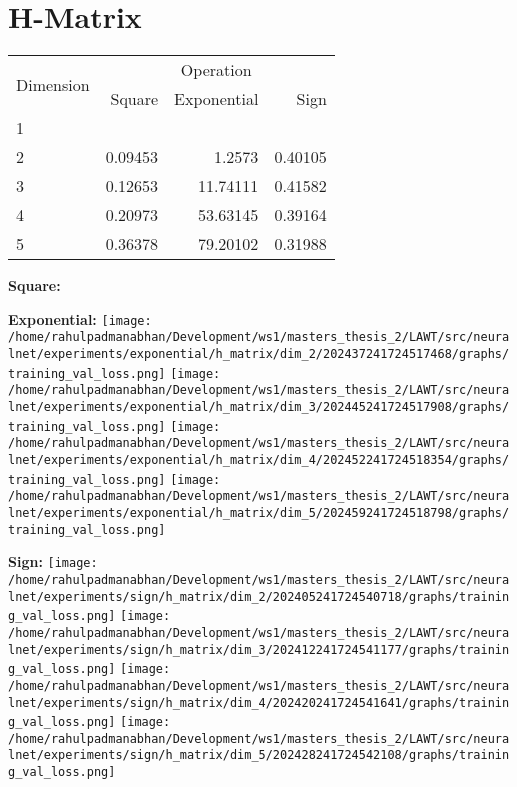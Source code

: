 \documentclass{article}
\begin{document}
\pagebreak
\section{H-Matrix}
\begin{tabular}{@{}lrrr@{}}
\toprule
\multirow{2}{*}{Dimension} & \multicolumn{3}{c}{Operation} \\
\cmidrule(l){2-4}
& Square & Exponential & Sign \\
\midrule
1 & & & \\
2 & 0.09453 & 1.2573 & 0.40105 \\
3 & 0.12653 & 11.74111 & 0.41582 \\
4 & 0.20973 & 53.63145 & 0.39164 \\
5 & 0.36378 & 79.20102 & 0.31988 \\
\bottomrule
\end{tabular}

\textbf{Square:}

\textbf{Exponential:}
\texttt{[image: /home/rahulpadmanabhan/Development/ws1/masters\_thesis\_2/LAWT/src/neuralnet/experiments/exponential/h\_matrix/dim\_2/202437241724517468/graphs/training\_val\_loss.png]}
\texttt{[image: /home/rahulpadmanabhan/Development/ws1/masters\_thesis\_2/LAWT/src/neuralnet/experiments/exponential/h\_matrix/dim\_3/202445241724517908/graphs/training\_val\_loss.png]}
\texttt{[image: /home/rahulpadmanabhan/Development/ws1/masters\_thesis\_2/LAWT/src/neuralnet/experiments/exponential/h\_matrix/dim\_4/202452241724518354/graphs/training\_val\_loss.png]}
\texttt{[image: /home/rahulpadmanabhan/Development/ws1/masters\_thesis\_2/LAWT/src/neuralnet/experiments/exponential/h\_matrix/dim\_5/202459241724518798/graphs/training\_val\_loss.png]}

\textbf{Sign:}
\texttt{[image: /home/rahulpadmanabhan/Development/ws1/masters\_thesis\_2/LAWT/src/neuralnet/experiments/sign/h\_matrix/dim\_2/202405241724540718/graphs/training\_val\_loss.png]}
\texttt{[image: /home/rahulpadmanabhan/Development/ws1/masters\_thesis\_2/LAWT/src/neuralnet/experiments/sign/h\_matrix/dim\_3/202412241724541177/graphs/training\_val\_loss.png]}
\texttt{[image: /home/rahulpadmanabhan/Development/ws1/masters\_thesis\_2/LAWT/src/neuralnet/experiments/sign/h\_matrix/dim\_4/202420241724541641/graphs/training\_val\_loss.png]}
\texttt{[image: /home/rahulpadmanabhan/Development/ws1/masters\_thesis\_2/LAWT/src/neuralnet/experiments/sign/h\_matrix/dim\_5/202428241724542108/graphs/training\_val\_loss.png]}
\end{document}
